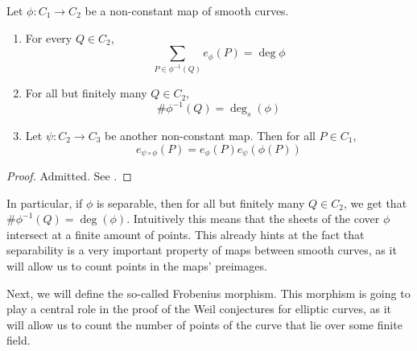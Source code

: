 \begin{proposition}
	\label{prop:ramification-properties}
	Let $\phi: C_1 \to C_2$ be a non-constant map of smooth curves.
	\begin{enumerate}[label=(\alph*)]
		\item For every $Q \in C_2$,
			\begin{equation*}
				\sum_{P \in \phi^{-1}(Q)}e_\phi(P) = \deg \phi
			\end{equation*}
		\item For all but finitely many $Q \in C_2$,
			\begin{equation*}
				\#\phi^{-1}(Q) = \deg_s(\phi)
			\end{equation*}
		\item Let $\psi: C_2 \to C_3$ be another non-constant map.
			Then for all $P \in C_1$,
			\begin{equation*}
				e_{\psi\circ\phi}(P) = e_{\phi}(P)e_{\psi}(\phi(P))
			\end{equation*}
	\end{enumerate}
\end{proposition}

\begin{proof}
	Admitted. See \cite[II.2.6]{silverman}.
\end{proof}

In particular, if $\phi$ is separable, then for all but finitely many
$Q \in C_2$, we get that $\#\phi^{-1}(Q) = \deg(\phi)$. Intuitively this means
that the sheets of the cover $\phi$ intersect at a finite amount 
of points. This already hints at the fact that separability is
a very important property of maps between smooth curves, as it will allow us
to count points in the maps' preimages.


Next, we will define the so-called Frobenius morphism.
This morphism is going to play a central role in the proof of the Weil
conjectures for elliptic curves, as it will allow us to count
the number of points of the curve that lie over some finite field.

